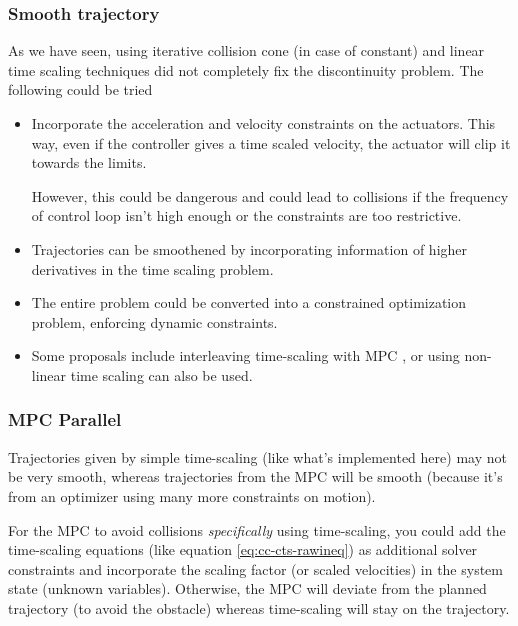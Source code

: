 \subsubsection{Smooth trajectory}

As we have seen, using iterative collision cone (in case of constant) and linear time scaling techniques did not completely fix the discontinuity problem. The following could be tried

\begin{itemize}
    \item Incorporate the acceleration and velocity constraints on the actuators. This way, even if the controller gives a time scaled velocity, the actuator will clip it towards the limits.
    
    However, this could be dangerous and could lead to collisions if the frequency of control loop isn't high enough or the constraints are too restrictive.
    
    \item Trajectories can be smoothened by incorporating information of higher derivatives in the time scaling problem.
    \item The entire problem could be converted into a constrained optimization problem, enforcing dynamic constraints.
    
    \item Some proposals include interleaving time-scaling with MPC \cite{tscc-mpc-2}, or using non-linear time scaling \cite{tscc-mpc-1} can also be used. 
\end{itemize}

\subsubsection{MPC Parallel}

Trajectories given by simple time-scaling (like what's implemented here) may not be very smooth, whereas trajectories from the MPC will be smooth (because it's from an optimizer using many more constraints on motion).

For the MPC to avoid collisions \emph{specifically} using time-scaling, you could add the time-scaling equations (like equation \ref{eq:cc-cts-rawineq}) as additional solver constraints and incorporate the scaling factor (or scaled velocities) in the system state (unknown variables). Otherwise, the MPC will deviate from the planned trajectory (to avoid the obstacle) whereas time-scaling will stay on the trajectory.

